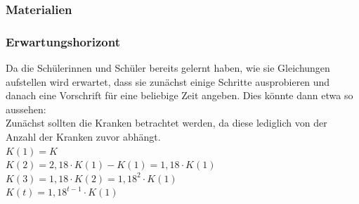 \subsubsection{Materialien}
\noindent{}
\subsubsection{Erwartungshorizont}
Da die Schülerinnen und Schüler bereits gelernt haben, wie sie Gleichungen aufstellen wird erwartet, dass sie zunächst einige Schritte ausprobieren und danach eine Vorschrift für eine beliebige Zeit angeben. Dies könnte dann etwa so aussehen:\\
Zunächst sollten die Kranken betrachtet werden, da diese lediglich von der Anzahl der Kranken zuvor abhängt.\\
$ K(1) = K$\\
$ K(2) = 2,18 \cdot K(1) - K(1) = 1,18 \cdot K(1)$\\
$ K(3) = 1,18 \cdot K(2) = 1,18^2 \cdot K(1)$\\
$ K(t) = 1,18^{t-1} \cdot K(1)$\\

